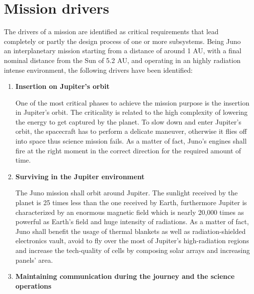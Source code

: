 \section{Mission drivers}
\label{sec:drivers}

    The drivers of a mission are identified as critical requirements that lead completely or partly the design process of one or more subsystems.%
     Being Juno an interplanetary mission starting from a distance of around 1 AU, with a final nominal distance from the Sun of 5.2 AU, and operating in an highly radiation intense environment, the following drivers have been identified: 

\begin{enumerate}
    \item \textbf{Insertion on Jupiter’s orbit} \cite{fact_sheet} \cite{video_1h} \cite{Juno_launch} \cite{Key_requirements} 
    
    One of the most critical phases to achieve the mission purpose is the insertion in Jupiter’s orbit. The criticality is related to the high complexity of lowering the energy to get captured by the planet. To slow down and enter Jupiter’s orbit, the spacecraft has to perform a delicate maneuver, otherwise it flies off into space thus science mission fails. As a matter of fact, Juno’s engines shall fire at the right moment in the correct direction for the required amount of time. 

    \item \textbf{Surviving in the Jupiter environment} \cite{fact_sheet} \cite{2006_overview} \cite{atmosphere}
    
    The Juno mission shall orbit around Jupiter. The sunlight received by the planet is 25 times less than the one received by Earth, furthermore Jupiter is characterized by an enormous magnetic field which is nearly 20,000 times as powerful as Earth’s field and huge intensity of radiations. As a matter of fact, Juno shall benefit the usage of thermal blankets as well as radiation-shielded electronics vault, avoid to fly over the most of Jupiter’s high-radiation regions and increase the tech-quality of cells by composing solar arrays and increasing panels’ area.
   
    \item \textbf{Maintaining communication during the journey and the science operations}\cite{Juno_launch}\cite{communication_support}
    

\end{enumerate}
